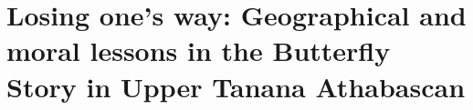 
%
%
%

\let\eachwordone\it


\chapter[Losing one's way]{\vspace{-25pt}Losing one's way: Geographical and moral lessons in the Butterfly Story in Upper Tanana Athabascan}


